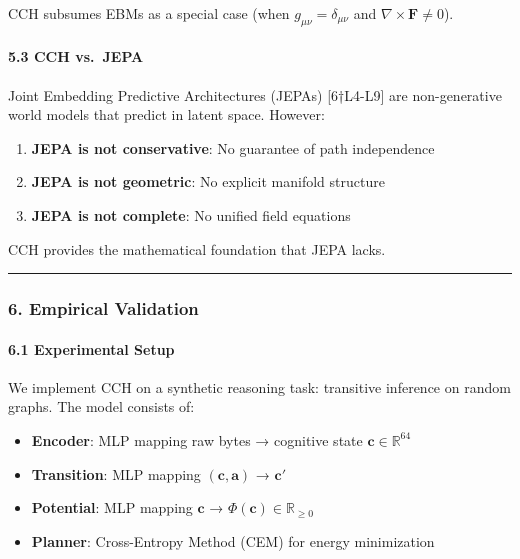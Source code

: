 \documentclass[
  11pt,
  a4paper,
]{article}
\providecommand{\tightlist}{%
  \setlength{\itemsep}{0pt}\setlength{\parskip}{0pt}}
\begin{document}
CCH subsumes EBMs as a special case (when
\(g_{\mu\nu} = \delta_{\mu\nu}\) and
\(\nabla \times \mathbf{F} \neq 0\)).

\paragraph{5.3 CCH vs.~JEPA}\label{cch-vs.-jepa}

Joint Embedding Predictive Architectures (JEPAs) {[}6†L4-L9{]} are
non-generative world models that predict in latent space. However:

\begin{enumerate}
\def\labelenumi{\arabic{enumi}.}
\tightlist
\item
  \textbf{JEPA is not conservative}: No guarantee of path independence
\item
  \textbf{JEPA is not geometric}: No explicit manifold structure
\item
  \textbf{JEPA is not complete}: No unified field equations
\end{enumerate}

CCH provides the mathematical foundation that JEPA lacks.

\begin{center}\rule{0.5\linewidth}{0.5pt}\end{center}

\subsubsection{6. Empirical Validation}\label{empirical-validation}

\paragraph{6.1 Experimental Setup}\label{experimental-setup}

We implement CCH on a synthetic reasoning task: transitive inference on
random graphs. The model consists of:

\begin{itemize}
\tightlist
\item
  \textbf{Encoder}: MLP mapping raw bytes → cognitive state
  \(\mathbf{c} \in \mathbb{R}^{64}\)
\item
  \textbf{Transition}: MLP mapping \((\mathbf{c}, \mathbf{a})\) →
  \(\mathbf{c}'\)
\item
  \textbf{Potential}: MLP mapping \(\mathbf{c}\) →
  \(\Phi(\mathbf{c}) \in \mathbb{R}_{\geq 0}\)
\item
  \textbf{Planner}: Cross-Entropy Method (CEM) for energy minimization
\end{itemize}
\end{document}
